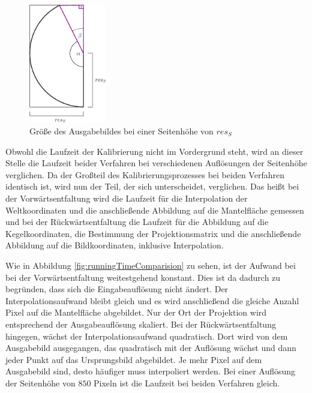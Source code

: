 \begin{figure}[!htb]
	\centering
	\includegraphics[width=0.3\textwidth]{images/sizeOutput.eps}
	\caption{Größe des Ausgabebildes bei einer Seitenhöhe von $res_S$}
	\label{fig:sizeOutput}
\end{figure}


Obwohl die Laufzeit der Kalibrierung nicht im Vordergrund steht, wird an dieser Stelle die Laufzeit beider Verfahren bei verschiedenen Auflösungen der Seitenhöhe verglichen. Da der Großteil des Kalibrierungsprozesses bei beiden Verfahren identisch ist, wird nun der Teil, der sich unterscheidet, verglichen. Das heißt bei der Vorwärtsentfaltung wird die Laufzeit für die Interpolation der Weltkoordinaten und die anschließende Abbildung auf die Mantelfläche gemessen und bei der Rückwärtsentfaltung die Laufzeit für die Abbildung auf die Kegelkoordinaten, die Bestimmung der Projektionsmatrix und die anschließende Abbildung auf die Bildkoordinaten, inklusive Interpolation.


Wie in Abbildung \ref{fig:runningTimeComparision} zu sehen, ist der Aufwand bei bei der Vorwärtsentfaltung weitestgehend konstant. Dies ist da dadurch zu begründen, dass sich die Eingabeauflösung nicht ändert. Der Interpolationsaufwand bleibt gleich und es wird anschließend die gleiche Anzahl Pixel auf die Mantelfläche abgebildet. Nur der Ort der Projektion wird entsprechend der Ausgabeauflösung skaliert.
Bei der Rückwärtsentfaltung hingegen, wächst der Interpolationsaufwand quadratisch. Dort wird von dem Ausgabebild ausgegangen, das quadratisch mit der Auflösung wächst und dann jeder Punkt auf das Ursprungsbild abgebildet. Je mehr Pixel auf dem Ausgabebild sind, desto häufiger muss interpoliert werden. Bei einer Auflösung der Seitenhöhe von $850$ Pixeln ist die Laufzeit bei beiden Verfahren gleich.

